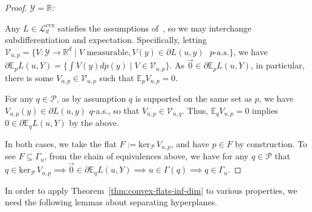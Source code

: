 \documentclass[11pt]{article} %
\newcommand{\Comments}{1}
\newcommand{\mynote}[2]{\ifnum\Comments=1\textcolor{#1}{#2}\fi}
\newcommand{\mytodo}[2]{\ifnum\Comments=1%
	\todo[linecolor=#1!80!black,backgroundcolor=#1,bordercolor=#1!80!black]{#2}\fi}
\newcommand{\jessie}[1]{\mynote{teal}{[JF: #1]}}
\newcommand{\btw}[1]{}%
\newcommand{\reals}{\mathbb{R}}
\newcommand{\supp}{\mathrm{supp}}
\newcommand{\zeros}[1]{\mathrm{ker}_\P\,#1}
\newcommand{\E}{\mathbb{E}}
\newcommand{\Lcvx}{\mathcal{L}^{\mathrm{cvx}}}
\renewcommand{\P}{\mathcal{P}}
\newcommand{\V}{\mathcal{V}}
\newcommand{\Y}{\mathcal{Y}}
\begin{document}
\begin{proof}
	\emph{$\Y=\reals$: }
	\btw{Note: this should work for any infinite $\Y$ so long as you have a good $\sigma$-algebra... working at least with $\Y \subseteq \reals$ just makes things easier since we can take the Borel $\sigma$-algebra for granted.}
	Any $L \in \Lcvx_d$ satisfies the assumptions of~\cite{ioffe1969minimization}, so we may interchange subdifferentiation and expectation.
	Specifically, letting $\V_{u,p} = \{V:\Y\to\reals^d \mid V \text{ measurable}, V(y) \in \partial L(u,y) \text{ $p$-a.s.}\}$, we have
	$\partial \E_p L(u,Y) = \{\int V(y)dp(y) \mid V\in\V_{u,p}\}$.
	As $\vec 0 \in \partial \E_p L(u,Y)$, in particular, there is some $V_{u,p} \in \V_{u,p}$ such that $\E_p V_{u,p} = 0$.
	\btw{Fleshing this out: $\exists E \subseteq \mathcal{B}(\Y)$ so that $p(E) = 0$ and $V(y) \in \partial L(u,y) \forall y \in E^c$.  Claim $q(E) = 0$, which would complete the claim that $V(y) \in \partial L(u,y) q$-a.s.  For contradiction, if $q(E) > 0$, then $\exists x \in E$ and open neighborhood $N_x \ni x$ with $q(N_x) > 0$.  Since $\supp(p) = \supp(q)$, we then have $p(N_x) >0$, contradicting $p(E) = 0$, and hence $V(y) \in \partial L(u,y)$ not $p$-a.s.  Therefore, we must have $q(E) = 0$, so $V(y) \in \partial L(u,y) q$-a.s.}
	For any $q\in\P$, as by assumption $q$ is supported on the same set as $p$, we have $V_{u,p}(y)\in\partial L(u,y)$ $q$-a.s., so that $V_{u,p}\in\V_{u,q}$\btw{I'm a bit too tired to see exactly how this follows, but it seems intuitively obvious. I'm okay to punt on it for the submission, but if someone has time to check, that would be great! \jessie{See above margin comment.  I think it's too much detail for the conference submission, but feel free to change my mind.}}.
	Thus, $\E_q V_{u,p} = 0$ implies $0\in\partial\E_q L(u,Y)$ by the above.
	\btw{For posterity, the bug: we want to conclude $\E_q V_{u,p} = 0 \implies q \in \Gamma_u$.  But the ``a.s.\ in $p$'' means we may not have $0 \in \partial \E_q L(u,Y)$, since maybe $V_{u,p}(y)$ is not in $\partial L(u,y)$ a.s.\ in $q$...}
	
	In both cases, we take the flat $F := \zeros{V_{u,p}}$, and have $p \in F$ by construction.
	To see $F \subseteq \Gamma_u$, from the chain of equivalences above, we have for any $q\in\P$ that $q \in \zeros{V_{u,p}} \implies \vec 0 \in \partial \E_q L(u,Y) \implies u \in \Gamma(q) \implies q \in \Gamma_u$.
\end{proof}

In order to apply Theorem~\ref{thm:convex-flats-inf-dim} to various properties, we need the following lemmas about separating hyperplanes.
\end{document}
